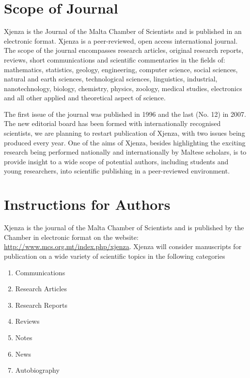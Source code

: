

\setcounter{pagna}{2}
\setcounter{page}{2}



\fmstyle
\footnotesize

\section*{Scope of Journal}

Xjenza is the Journal of the Malta Chamber of Scientists and is published in an electronic format. Xjenza is a peer-reviewed, open access international journal. The scope
of the journal encompasses research articles, original research reports, reviews, short communications and scientific commentaries in the fields of: mathematics, statistics, geology, engineering, computer science, social sciences, natural and earth sciences, technological
sciences, linguistics, industrial, nanotechnology, biology, chemistry, physics, zoology, medical studies, electronics and all other applied and theoretical aspect of science.

The first issue of the journal was published in 1996 and the last (No. 12) in 2007. The new editorial board has been formed with internationally recognised scientists, we are planning to restart publication of Xjenza, with two issues being produced every year. One of the aims of Xjenza, besides highlighting the exciting research being performed nationally and internationally by Maltese scholars, is to provide insight to a wide scope of potential authors, including students and young researchers, into scientific publishing in a peer-reviewed environment.

\section*{Instructions for Authors}

Xjenza is the journal of the Malta Chamber of Scientists and is published by the Chamber in electronic format on the website: \href{http://www.mcs.org.mt/index.php/xjenza}{http://www.mcs.org.mt/index.php/xjenza}. Xjenza will consider manuscripts for publication on a wide variety of scientific topics in the following categories

\begin{enumerate}
\item Communications
\item Research Articles
\item Research Reports
\item Reviews
\item Notes
\item News
\item Autobiography
\end{enumerate}

